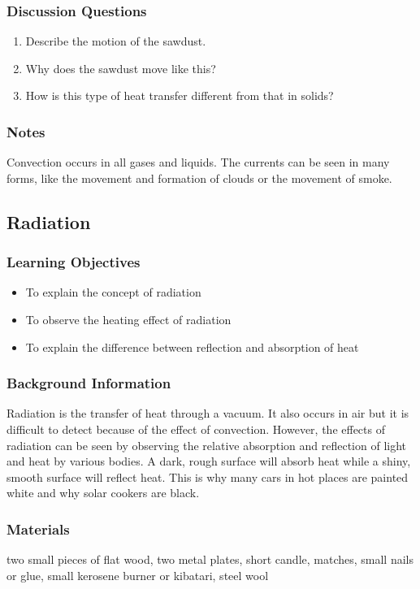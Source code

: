 \subsubsection*{Discussion Questions}
\begin{enumerate}
\item{Describe the motion of the sawdust.}
\item{Why does the sawdust move like this?}
\item{How is this type of heat transfer different from that in solids?}
\end{enumerate}

\subsubsection*{Notes}
Convection occurs in all gases and liquids.  The currents can be seen in many forms, like the movement and formation of clouds or the movement of smoke.

\subsection{Radiation}

\subsubsection*{Learning Objectives}
\begin{itemize}
\item{To explain the concept of radiation}
\item{To observe the heating effect of radiation}
\item{To explain the difference between reflection and absorption of heat}
\end{itemize}

\subsubsection*{Background Information}
Radiation is the transfer of heat through a vacuum.  It also occurs in air but it is difficult to detect because of the effect of convection.
However, the effects of radiation can be seen by observing the relative absorption and reflection of light and heat by various bodies.  A dark, rough surface will absorb heat while a shiny, smooth surface will reflect heat.  This is why many cars in hot places are painted white and why solar cookers are black.

\subsubsection*{Materials}
two small pieces of flat wood, two metal plates, short candle, matches, small nails or glue, small kerosene burner or kibatari, steel wool

